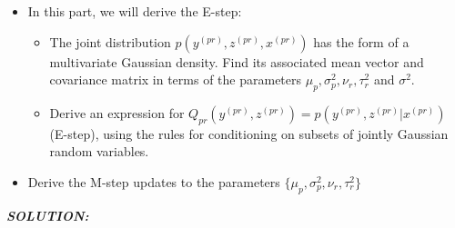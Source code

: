 \documentclass{article}
\theoremstyle{definition}
\theoremstyle{definition}
\theoremstyle{remark}
\begin{document}
\begin{itemize}
  \item In this part, we will derive the E-step:
    \begin{itemize}
      \item The joint distribution $p(y^{(pr)}, z^{(pr)}, x^{(pr)})$ has the form of a multivariate Gaussian
density. Find its associated mean vector and covariance matrix in terms of the parameters $\mu_p, \sigma_p^2, \nu_r, \tau_r^2$ and $\sigma^2$.
      \item Derive an expression for $Q_{pr}(y^{(pr)}, z^{(pr)}) = p(y^{(pr)}, z^{(pr)}|x^{(pr)})$ (E-step), using the
rules for conditioning on subsets of jointly Gaussian random variables.
    \end{itemize}
  \item Derive the M-step updates to the parameters $\{\mu_p, \sigma_p^2, \nu_r, \tau_r^2\}$
\end{itemize}
\emph{\textbf{SOLUTION:}}\\
\end{document}
